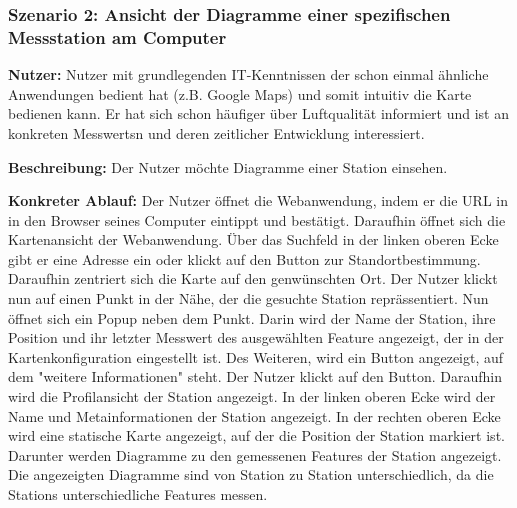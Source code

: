 \subsubsection*{Szenario 2: Ansicht der Diagramme einer spezifischen Messstation am Computer}
\textbf{Nutzer:} Nutzer mit grundlegenden IT-Kenntnissen der schon einmal ähnliche Anwendungen bedient hat (z.B. Google Maps) 
und somit intuitiv die Karte bedienen kann. Er hat sich schon häufiger über Luftqualität informiert und ist an konkreten 
\glspl{Messwert}n und deren zeitlicher Entwicklung interessiert.

\textbf{Beschreibung:} Der Nutzer möchte Diagramme einer \gls{Station} einsehen.

\textbf{Konkreter Ablauf:} Der Nutzer öffnet die \gls{Webanwendung}, indem er die URL in in den Browser seines Computer eintippt 
und bestätigt. Daraufhin öffnet sich die Kartenansicht der \gls{Webanwendung}. Über das Suchfeld in der linken oberen Ecke gibt 
er eine Adresse ein oder klickt auf den Button zur Standortbestimmung. Daraufhin zentriert sich die Karte auf den genwünschten Ort. 
Der Nutzer klickt nun auf einen Punkt in der Nähe, der die gesuchte \gls{Station} reprässentiert. Nun öffnet sich ein Popup neben 
dem Punkt. Darin wird der Name der \gls{Station}, ihre Position und ihr letzter \gls{Messwert} des ausgewählten \gls{Feature} 
angezeigt, der in der Kartenkonfiguration eingestellt ist. Des Weiteren, wird ein Button angezeigt, auf dem "weitere Informationen" 
steht. Der Nutzer klickt auf den Button.
Daraufhin wird die Profilansicht der \gls{Station} angezeigt. In der linken oberen Ecke wird der Name und Metainformationen 
der \gls{Station} angezeigt. In der rechten oberen Ecke wird eine statische Karte angezeigt, auf der die Position der \gls{Station} 
markiert ist.
Darunter werden Diagramme zu den gemessenen Features der \gls{Station} angezeigt. Die angezeigten Diagramme sind von \gls{Station} 
zu \gls{Station} unterschiedlich, da die \glspl{Station} unterschiedliche Features messen.